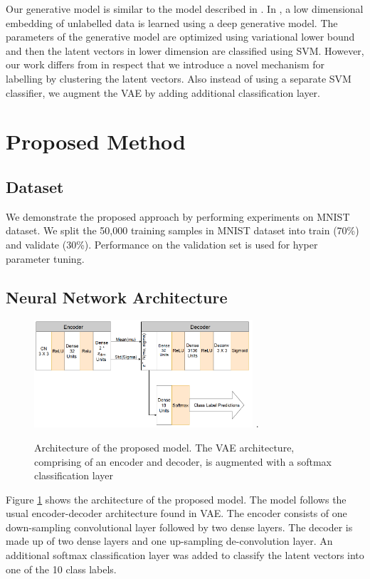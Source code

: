\documentclass[runningheads]{llncs}
\begin{document}
Our generative model is similar to the model described in \cite{kingma_2014}.
In \cite{kingma_2014}, a low dimensional embedding of unlabelled data is learned using a deep generative model.
The parameters of the generative model are optimized using variational lower bound and then the latent vectors in lower dimension are classified using SVM.
However, our work differs from \cite{kingma_2014} in respect that we introduce a novel mechanism for labelling by clustering the latent vectors.
Also instead of using a separate SVM classifier, we augment the VAE by adding additional classification layer.

\section{Proposed Method}

\subsection{Dataset}
We demonstrate the proposed approach by performing experiments on MNIST dataset.
We split the 50,000 training samples in MNIST dataset into  train (70\%) and validate (30\%).
Performance on the validation set is used for hyper parameter tuning.

\subsection{Neural Network Architecture}

\begin{figure}[!t]
\centering
\includegraphics[width=3.2in]{vae_arch_v4}
\DeclareGraphicsExtensions.
\caption{Architecture of the proposed model. The VAE architecture, comprising of an encoder and decoder, is augmented with a softmax classification layer}
\label{vae_architecture}
\end{figure}

Figure \ref{vae_architecture} shows the architecture of the proposed model.
The model follows the usual encoder-decoder architecture found in VAE.
The encoder consists of one down-sampling convolutional layer followed by two dense layers.
The decoder is made up of two dense layers and one up-sampling de-convolution layer.
An additional softmax classification layer was added to classify the latent vectors into one of the 10 class labels.
\end{document}
